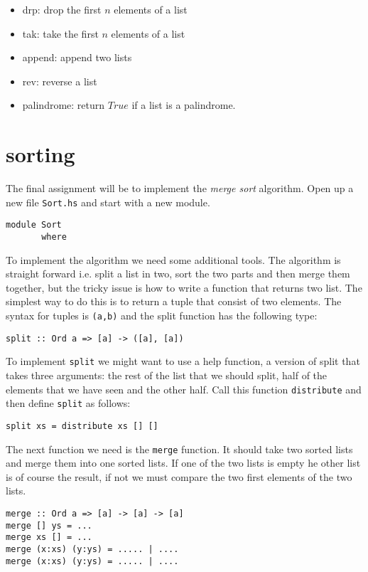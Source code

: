 \documentclass[a4paper,11pt]{article}
\newcommand{\nnsection}[1]{
\section*{#1}
\addcontentsline{toc}{section}{#1}
}
\begin{document}
\begin{itemize}
\item drp: drop the first $n$ elements of a list
\item tak: take the first $n$ elements of a list
\item append: append two lists
\item rev: reverse a list
\item palindrome: return $True$ if a list is a palindrome.
\end{itemize}

\nnsection{sorting}

The final assignment will be to implement the {\em merge sort}
algorithm. Open up a new file {\tt Sort.hs} and start with a new module.

\begin{verbatim}
module Sort
       where
\end{verbatim}

To implement the algorithm we need some additional tools. The algorithm
is straight forward i.e. split a list in two, sort the two parts and
then merge them together, but the tricky issue is how to write a
function that returns two list. The simplest way to do this is to
return a tuple that consist of two elements. The syntax for tuples is
{\tt (a,b)} and the split function has the following type:

\begin{verbatim}
split :: Ord a => [a] -> ([a], [a])
\end{verbatim}

To implement {\tt split} we might want to use a help function, a
version of split that takes three arguments: the rest of the list that
we should split, half of the elements that we have seen and the other
half. Call this function {\tt distribute} and then define {\tt split}
as follows:

\begin{verbatim}
split xs = distribute xs [] []
\end{verbatim}

The next function we need is the {\tt merge} function. It should take
two sorted lists and merge them into one sorted lists. If one of the
two lists is empty he other list is of course the result, if not we
must compare the two first elements of the two lists. 

\begin{verbatim}
merge :: Ord a => [a] -> [a] -> [a]
merge [] ys = ...
merge xs [] = ...
merge (x:xs) (y:ys) = ..... | ....
merge (x:xs) (y:ys) = ..... | ....
\end{verbatim}
\end{document}
